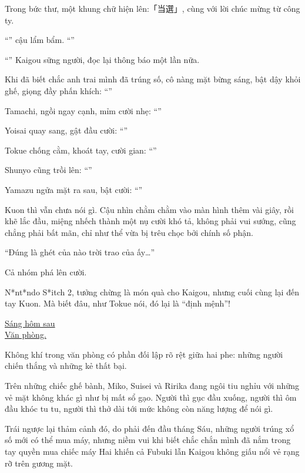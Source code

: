 \documentclass[../main.tex]{subfiles}
\begin{document}
Trong bức thư, một khung chữ hiện lên:「当選」, cùng với lời chúc mừng từ công ty.

``'' cậu lẩm bẩm. ``''

``'' Kaigou sững người, đọc lại thông báo một lần nữa.

Khi đã biết chắc anh trai mình đã trúng số, cô nàng mặt bừng sáng, bật dậy khỏi ghế, giọng đầy phấn khích: ``''

Tamachi, ngồi ngay cạnh, mỉm cười nhẹ: ``''

Yoisai quay sang, gật đầu cười: ``''

Tokue chống cằm, khoát tay, cười gian: ``''

Shunyo cũng trồi lên: ``''

Yamazu ngửa mặt ra sau, bật cười: ``''

Kuon thì vẫn chưa nói gì. Cậu nhìn chằm chằm vào màn hình thêm vài giây, rồi khẽ lắc đầu, miệng nhếch thành một nụ cười khó tả, không phải vui sướng, cũng chẳng phải bất mãn, chỉ như thể vừa bị trêu chọc bởi chính số phận.

``Đúng là ghét của nào trời trao của ấy\dots''

Cả nhóm phá lên cười.

N*nt*ndo S*itch 2, tưởng chừng là món quà cho Kaigou, nhưng cuối cùng lại đến tay Kuon. Mà biết đâu, như Tokue nói, đó lại là ``định mệnh''!

\begin{center}
    \uline{Sáng hôm sau\\Văn phòng.}
\end{center}

Không khí trong văn phòng có phần đối lập rõ rệt giữa hai phe: những người chiến thắng và những kẻ thất bại.

Trên những chiếc ghế bành, Miko, Suisei và Ririka đang ngôi tiu nghỉu với những vẻ mặt không khác gì như bị mất sổ gạo. Người thì gục đầu xuống, người thì ôm đầu khóc tu tu, người thì thở dài tới mức không còn năng lượng để nói gì.

Trái ngược lại thảm cảnh đó, do phải đến đầu tháng Sáu, những người trúng xổ số mới có thể mua máy, nhưng niềm vui khi biết chắc chắn mình đã nắm trong tay quyền mua chiếc máy Hai khiến cả Fubuki lẫn Kaigou không giấu nổi vẻ rạng rỡ trên gương mặt.
\end{document}
